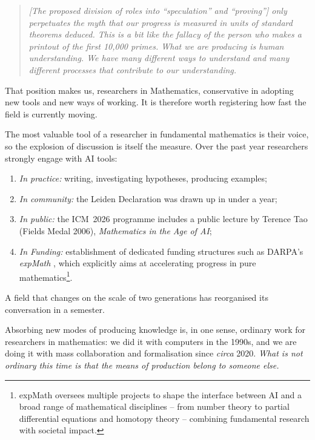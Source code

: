 \documentclass[11pt, a4paper,twosided]{amsart}
\newcommand{\key}[1]{\emph{#1}}
\begin{document}
\begin{quotation}\small\itshape
  [The proposed division of roles into ``speculation'' and ``proving''] only perpetuates the myth that our progress is measured in units of standard theorems deduced. This is a bit like the fallacy of the person who makes a printout of the first 10,000 primes. \key{What we are producing is human understanding.} We have many different ways to understand and many different processes that contribute to our understanding.\hfill\textup{\cite[\S~5]{thurston1994}}
\end{quotation}


That position makes us, researchers in Mathematics, conservative in adopting new tools and new ways of working. It is therefore worth registering how fast the field is currently moving.

The most valuable tool of a researcher in fundamental mathematics is their voice, so the explosion of discussion is itself the measure. Over the past year researchers strongly engage with AI tools:
\begin{enumerate}
\item \emph{In practice:} writing, investigating hypotheses, producing examples;
\item \emph{In community:} the Leiden Declaration \cite{leiden2026} was drawn up in under a year;
\item \emph{In public:} the ICM~2026 programme includes a public lecture by Terence Tao (Fields Medal 2006), \emph{Mathematics in the Age of AI}\cite{icm2026};
\item \emph{In Funding:} establishment of dedicated funding structures such as DARPA's \emph{expMath} \cite{expmath}, which explicitly aims at accelerating progress in pure mathematics\footnote{expMath oversees multiple projects to shape the interface between AI and a broad range of mathematical disciplines -- from number theory to partial differential equations and homotopy theory -- combining fundamental research with societal impact.}.
\end{enumerate}
A field that changes on the scale of two generations has reorganised its conversation in a semester.

Absorbing new modes of producing knowledge is, in one sense, ordinary work for researchers in mathematics: we did it with computers in the 1990s, and we are doing it with mass collaboration and formalisation since \emph{circa} 2020. \key{What is not ordinary this time is that the means of production belong to someone else.}
\end{document}
